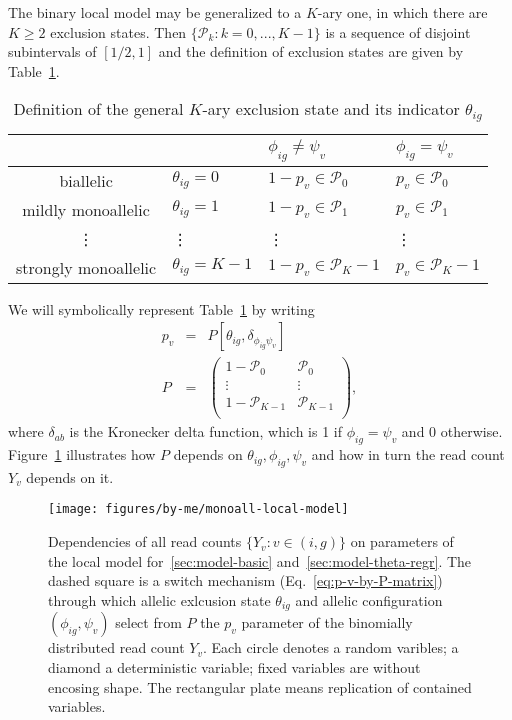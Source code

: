 \documentclass[letterpaper]{article}
\begin{document}
The binary local model may be generalized to a \(K\)-ary one, in which there
are \(K\ge 2\) exclusion states.  Then \(\{\mathcal{P}_k: k=0,...,K-1\}\) is a
sequence of disjoint subintervals of \([1/2,1]\) and
the definition of exclusion
states are given by Table~\ref{tab:def-exclusion-state-multi}.
\begin{table}[h]
\begin{center}
\begin{tabular}{cl|ll|}
& & \(\phi_{ig}\neq\psi_v\) & \(\phi_{ig}=\psi_v\) \\
\hline
biallelic & \(\theta_{ig}=0\) & \(1-p_v \in \mathcal{P}_0\) & \(p_v \in \mathcal{P}_0\) \\
mildly monoallelic & \(\theta_{ig}=1\) & \(1-p_v \in \mathcal{P}_1\) & \(p_v \in \mathcal{P}_1\) \\
\vdots & \vdots & \vdots & \vdots \\
strongly monoallelic & \(\theta_{ig}=K-1\) & \(1-p_v \in \mathcal{P}_K-1\) & \(p_v \in \mathcal{P}_K-1\) \\
\hline
\end{tabular}
\caption{
Definition of the general \(K\)-ary exclusion state and its indicator \(\theta_{ig}\)
}
\label{tab:def-exclusion-state-multi}
\end{center}
\end{table}

We will symbolically represent Table~\ref{tab:def-exclusion-state-multi} by writing
\begin{eqnarray}
\label{eq:p-v-by-P-matrix}
p_v &=& P[\theta_{ig},\delta_{\phi_{ig}\psi_v}] \\
\label{eq:P-matrix}
P &=&
\begin{pmatrix}
1-\mathcal{P}_0 & \mathcal{P}_0 \\
\vdots & \vdots \\
1-\mathcal{P}_{K-1} & \mathcal{P}_{K-1} \\
\end{pmatrix},
\end{eqnarray}
where \(\delta_{ab}\) is
the Kronecker delta function, which is 1 if \(\phi_{ig}=\psi_v\) and 0
otherwise.  Figure~\ref{fig:plate-local} illustrates how \(P\) depends on
\(\theta_{ig}, \phi_{ig}, \psi_v\) and how in turn the read count \(Y_v\)
depends on it.

\begin{figure}[t]

\begin{center}
\texttt{[image: figures/by-me/monoall-local-model]}
\end{center}
\caption{
Dependencies of all read counts \(\{Y_v : v\in(i,g)\}\) on parameters of the
local model for~\ref{sec:model-basic} and~\ref{sec:model-theta-regr}.  The
dashed square is a switch mechanism (Eq.~\ref{eq:p-v-by-P-matrix}) through
which allelic exlcusion state \(\theta_{ig}\) and allelic configuration
\((\phi_{ig},\psi_v)\) select from \(P\) the \(p_v\) parameter of the
binomially distributed read count \(Y_v\).  Each circle denotes a random
varibles; a diamond a deterministic variable; fixed variables are without
encosing shape.  The rectangular plate means replication of contained
variables.
}
\label{fig:plate-local}
\end{figure}
\end{document}
